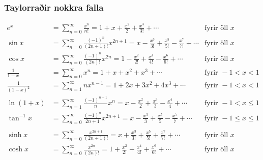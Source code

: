 \documentclass[icelandic,a4paper,12pt]{article}
\begin{document}
\subsubsection{Taylorraðir nokkra falla}
\begin{align*}
e^x&=\sum_{n=0}^\infty\frac{x^n}{n!}
    =1+x+\frac{x^2}{2}+\frac{x^3}{3!}
    +\cdots
  &\mbox{fyrir öll }x\\
\sin x&=  \sum_{n=0}^\infty\frac{(-1)^n}{(2n+1)!}x^{2n+1}
    =x-\frac{x^3}{3!}+\frac{x^5}{5!}-\frac{x^7}{7!}+\cdots
    &\mbox{fyrir öll }x\\ 
\cos x&=  \sum_{n=0}^\infty\frac{(-1)^n}{(2n)!}x^{2n}
    =1-\frac{x^2}{2!}+\frac{x^4}{4!}-\frac{x^6}{6!}+\cdots
    &\mbox{fyrir öll }x\\
\frac{1}{1-x}&=\sum_{n=0}^\infty x^n
    =1+x+x^2+x^3+\cdots
&\mbox{fyrir }-1<x<1\\
\frac{1}{(1-x)^2}&=\sum_{n=1}^\infty nx^{n-1}
    =1+2x+3x^2+4x^3+\cdots
&\mbox{fyrir }-1<x<1\\
\ln(1+x)&=  \sum_{n=1}^\infty\frac{(-1)^{n-1}}{n}x^n
    =x-\frac{x^2}{2}+\frac{x^3}{3}-\frac{x^4}{4}+\cdots
    &\mbox{fyrir }-1<x\leq 1\\
\tan^{-1} x&=  \sum_{n=0}^\infty\frac{(-1)^n}{2n+1}x^{2n+1}
    =x-\frac{x^3}{3}+\frac{x^5}{5}-\frac{x^7}{7}+\cdots
    &\mbox{fyrir }-1\leq x\leq 1\\\\
\sinh x&=  \sum_{n=0}^\infty\frac{x^{2n+1}}{(2n+1)!}
    =x+\frac{x^3}{3!}+\frac{x^5}{5!}+\frac{x^7}{7!}+\cdots
    &\mbox{fyrir öll } x\\
\cosh x&=  \sum_{n=0}^\infty\frac{x^{2n}}{(2n)!}
    =1+\frac{x^2}{2!}+\frac{x^4}{4!}+\frac{x^6}{6!}+\cdots
    &\mbox{fyrir öll } x\\
\end{align*} 
\end{document}

